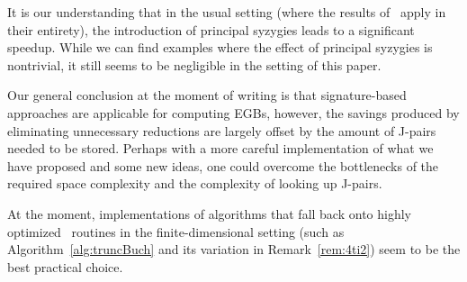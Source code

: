 \begin{example}
It is our understanding that in the usual setting (where the results of~\cite{Gao-Volny-Wang:signature-GBs} apply in their entirety), the introduction of principal syzygies leads to a significant speedup. While we can find examples where the effect of principal syzygies is nontrivial, it still seems to be negligible in the setting of this paper.
\end{example}

Our general conclusion at the moment of writing is that signature-based approaches are applicable for computing EGBs, however, the savings produced by eliminating unnecessary reductions are largely offset by the amount of J-pairs needed to be stored.
Perhaps with a more careful implementation of what we have proposed and some new ideas, one could overcome the bottlenecks of the required space complexity and the complexity of looking up  J-pairs. 

At the moment, implementations of algorithms that fall back onto highly optimized \GBs\ routines in the finite-dimensional setting (such as Algorithm~\ref{alg:truncBuch} and its variation in Remark~\ref{rem:4ti2}) seem to be the best practical choice. 